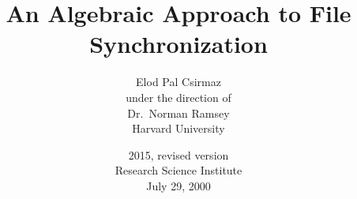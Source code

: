 \title{
An Algebraic Approach to File Synchronization
}

\author{
Elod Pal Csirmaz
\vspace{0.5in}\\
under the direction of\\
Dr.\ Norman Ramsey\\
Harvard University
\vspace{1in}
}


\date{
2015, revised version\\
\vspace{.5in}
Research Science Institute\\
July 29, 2000
}
